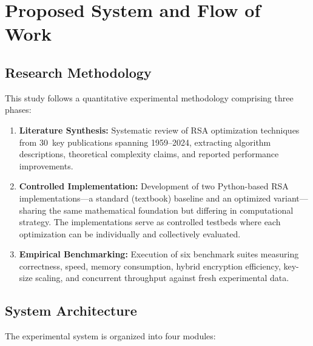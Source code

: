 \documentclass[journal]{IEEEtran}
\begin{document}
\section{Proposed System and Flow of Work}
\label{sec:proposed}

\subsection{Research Methodology}

This study follows a quantitative experimental methodology comprising three phases:

\begin{enumerate}
    \item \textbf{Literature Synthesis:} Systematic review of RSA optimization techniques from 30~key publications spanning 1959--2024, extracting algorithm descriptions, theoretical complexity claims, and reported performance improvements.

    \item \textbf{Controlled Implementation:} Development of two Python-based RSA implementations---a standard (textbook) baseline and an optimized variant---sharing the same mathematical foundation but differing in computational strategy. The implementations serve as controlled testbeds where each optimization can be individually and collectively evaluated.

    \item \textbf{Empirical Benchmarking:} Execution of six benchmark suites measuring correctness, speed, memory consumption, hybrid encryption efficiency, key-size scaling, and concurrent throughput against fresh experimental data.
\end{enumerate}

\subsection{System Architecture}

The experimental system is organized into four modules:
\end{document}
